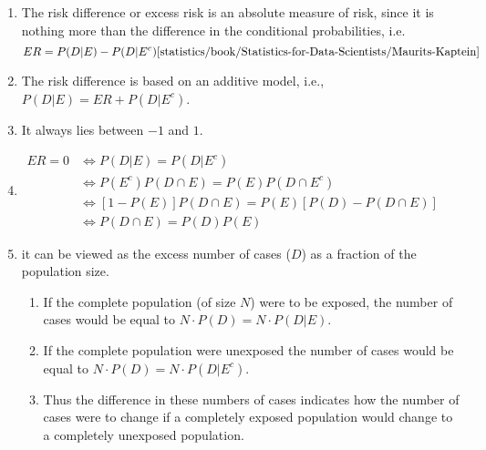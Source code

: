 \begin{enumerate}
    \item The risk difference or excess risk is an absolute measure of risk, since it is nothing more than the difference in the conditional probabilities, i.e.
    \hfill \cite{statistics/book/Statistics-for-Data-Scientists/Maurits-Kaptein}
    \[
        ER = P(D|E) - P(D|E^c)
        \hfill 
        \text{\cite{statistics/book/Statistics-for-Data-Scientists/Maurits-Kaptein}}
    \]

    \item The risk difference is based on an additive model, i.e., $P (D|E) = ER + P (D|E^c)$.
    \hfill \cite{statistics/book/Statistics-for-Data-Scientists/Maurits-Kaptein}

    \item It always lies between $-1$ and $1$.
    \hfill \cite{statistics/book/Statistics-for-Data-Scientists/Maurits-Kaptein}

    \item $
        \begin{aligned}
            ER = 0 
            & \Longleftrightarrow 
            P (D|E) = P (D|E^c) \\
            & \Longleftrightarrow 
            P (E^c) P (D \cap E) = P (E) P (D \cap E^c) \\
            & \Longleftrightarrow 
            [1 - P (E)] P (D \cap E) = P (E)[P(D) - P (D \cap E)] \\
            & \Longleftrightarrow 
            P (D \cap E) = P (D) P (E)
        \end{aligned}
    $
    \hfill \cite{statistics/book/Statistics-for-Data-Scientists/Maurits-Kaptein}

    \item it can be viewed as the excess number of cases ($D$) as a fraction of the population size. 
    \hfill \cite{statistics/book/Statistics-for-Data-Scientists/Maurits-Kaptein}
    \begin{enumerate}
        \item If the complete population (of size $N$) were to be exposed, the number of cases would be equal to $N \cdot P (D) = N \cdot P (D|E)$.
        \hfill \cite{statistics/book/Statistics-for-Data-Scientists/Maurits-Kaptein}

        \item If the complete population were unexposed the number of cases would be equal to $N \cdot P (D) = N \cdot P (D|E^c)$.
        \hfill \cite{statistics/book/Statistics-for-Data-Scientists/Maurits-Kaptein}

        \item Thus the difference in these numbers of cases indicates how the number of cases were to change if a completely exposed population would change to a completely unexposed population.
        \hfill \cite{statistics/book/Statistics-for-Data-Scientists/Maurits-Kaptein}
    \end{enumerate}
\end{enumerate}

